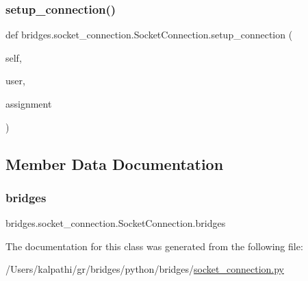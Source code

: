 \mbox{\label{classbridges_1_1socket__connection_1_1_socket_connection_a346d70ef1084f4387df0f3027ac0f527}} 
\subsubsection{\texorpdfstring{setup\_connection()}{setup\_connection()}}
{\footnotesize\ttfamily def bridges.\+socket\+\_\+connection.\+Socket\+Connection.\+setup\+\_\+connection (\begin{DoxyParamCaption}\item[{}]{self,  }\item[{}]{user,  }\item[{}]{assignment }\end{DoxyParamCaption})}



\subsection{Member Data Documentation}
\mbox{\label{classbridges_1_1socket__connection_1_1_socket_connection_a81266f99e3601d2d2abeb95bd78fc602}} 
\subsubsection{\texorpdfstring{bridges}{bridges}}
{\footnotesize\ttfamily bridges.\+socket\+\_\+connection.\+Socket\+Connection.\+bridges}



The documentation for this class was generated from the following file\+:\begin{DoxyCompactItemize}
\item 
/\+Users/kalpathi/gr/bridges/python/bridges/\mbox{\hyperlink{socket__connection_8py}{socket\+\_\+connection.\+py}}\end{DoxyCompactItemize}
